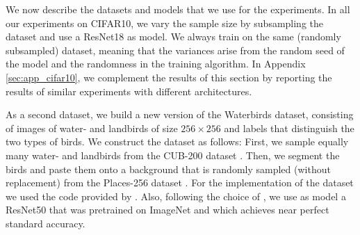 We now describe the datasets and models that we use for the
experiments. In all our experiments on CIFAR10, we vary the sample
size by subsampling the dataset and use a ResNet18 \cite{He16} as
model. We always train on the same (randomly subsampled) dataset,
meaning that the variances arise from the random seed of the model and
the randomness in the training algorithm. In Appendix
\ref{sec:app_cifar10}, we complement the results of this section by
reporting the results of similar experiments with different
architectures.


As a second dataset, we build a new version of the Waterbirds
dataset, consisting of images of water- and
landbirds of size $256 \times 256$ and labels that distinguish the
two types of birds. We construct the dataset as follows: First, we
sample equally many water- and landbirds from the CUB-200 dataset
\cite{Welinder10}. Then, we segment the birds and paste them onto a
background that is randomly sampled (without replacement) from the Places-256 dataset \cite{zhou17}.
For the implementation of the dataset we used the code provided by \citet{Sagawa20}. Also, following the choice of \citet{Sagawa20}, we use as model a ResNet50 that was pretrained on ImageNet and which achieves near perfect standard accuracy.


